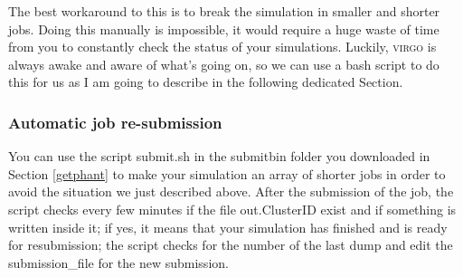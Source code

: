 \documentclass[10pt,a4paper,twoside]{article} %
\begin{document}
The best workaround to this is to break the simulation in smaller and shorter jobs. Doing this manually is impossible, it would require a huge waste of time from you to constantly check the status of your simulations. Luckily, \textsc{virgo} is always awake and aware of what's going on, so we can use a bash script to do this for us as I am going to describe in the following dedicated Section.

\subsubsection{Automatic job re-submission}

You can use the script submit.sh in the submitbin folder you downloaded in Section \ref{getphant} to make your simulation an array of shorter jobs in order to avoid the situation we just described above.
After the submission of the job, the script checks every few minutes if the file out.ClusterID exist and if something is written inside it;
if yes, it means that your simulation has finished and is ready for resubmission; the script checks for the number of the last dump and edit the submission\_file for the new submission. 
\end{document}
